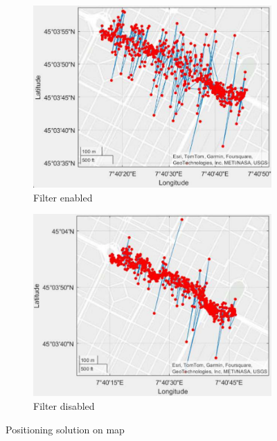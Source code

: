 \begin{figure}[H]
  \begin{subfigure}{.22\textwidth}
  \centering
    \includegraphics[width=1\linewidth]{images/C_No_filter_higher_20.pdf}
    \caption{Filter enabled}
    \label{fig:C_No_filter_higher_20}
  \end{subfigure}
  \begin{subfigure}{.22\textwidth}
  \centering
    \includegraphics[width=1\linewidth]{images/C_No_filter_disabled.pdf}
    \caption{Filter disabled}
    \label{fig:C_No_filter_disabled}
  \end{subfigure}
  \vspace{10pt}
  \caption{Positioning solution on map}
  \captionsetup[subfigure]{position=below}
\end{figure}
\vspace{0.1cm}

